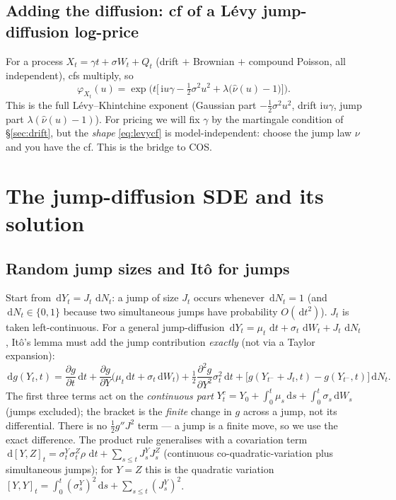 \documentclass[11pt]{article}
\newcommand{\ii}{\mathrm{i}}
\newcommand{\dd}{\,\mathrm{d}}
\newcommand{\ch}{\varphi}
\begin{document}
\subsection{Adding the diffusion: cf of a L\'evy jump-diffusion log-price}
For a process $X_t=\gamma t+\sigma W_t+Q_t$ (drift $+$ Brownian $+$ compound Poisson, all independent),
cfs multiply, so
\begin{equation}\label{eq:levycf}
\ch_{X_t}(u)=\exp\!\Big(t\Big[\,\ii u\gamma-\tfrac12\sigma^2u^2
   +\lambda\big(\widehat\nu(u)-1\big)\Big]\Big).
\end{equation}
This is the full L\'evy--Khintchine exponent (Gaussian part $-\tfrac12\sigma^2u^2$, drift $\ii u\gamma$,
jump part $\lambda(\widehat\nu(u)-1)$). For pricing we will fix $\gamma$ by the martingale condition of
\S\ref{sec:drift}, but the \emph{shape} \eqref{eq:levycf} is model-independent: choose the jump law
$\nu$ and you have the cf. This is the bridge to COS.

\section{The jump-diffusion SDE and its solution}

\subsection{Random jump sizes and It\^o for jumps}
Start from $\dd Y_t=J_t\,\dd N_t$: a jump of size $J_t$ occurs whenever $\dd N_t=1$ (and $\dd N_t\in\{0,1\}$
because two simultaneous jumps have probability $O(\dd t^2)$). $J_t$ is taken left-continuous. For a general
jump-diffusion $\dd Y_t=\mu_t\,\dd t+\sigma_t\,\dd W_t+J_t\,\dd N_t$, It\^o's lemma must add the jump
contribution \emph{exactly} (not via a Taylor expansion):
\begin{equation}\label{eq:itojump}
\dd g(Y_t,t)=\frac{\partial g}{\partial t}\dd t
+\frac{\partial g}{\partial Y}\big(\mu_t\dd t+\sigma_t\dd W_t\big)
+\tfrac12\frac{\partial^2 g}{\partial Y^2}\sigma_t^2\dd t
+\big[g(Y_{t^-}+J_t,t)-g(Y_{t^-},t)\big]\dd N_t.
\end{equation}
The first three terms act on the \emph{continuous part} $Y^c_t=Y_0+\int_0^t\mu_s\dd s+\int_0^t\sigma_s\dd W_s$
(jumps excluded); the bracket is the \emph{finite} change in $g$ across a jump, not its differential.
There is no $\tfrac12 g''J^2$ term --- a jump is a finite move, so we use the exact difference. The
product rule generalises with a covariation term
$\dd[Y,Z]_t=\sigma^Y_t\sigma^Z_t\rho\,\dd t+\sum_{s\le t}J^Y_sJ^Z_s$ (continuous co-quadratic-variation
plus simultaneous jumps); for $Y=Z$ this is the quadratic variation
$[Y,Y]_t=\int_0^t(\sigma^Y_s)^2\dd s+\sum_{s\le t}(J^Y_s)^2$.
\end{document}
